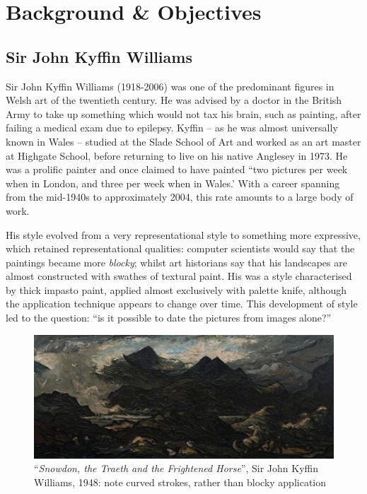 \chapter{Background \& Objectives}


\section{Sir John Kyffin Williams}

Sir John Kyffin Williams (1918-2006) was one of the predominant figures in Welsh art of the
twentieth century.  He was advised by a doctor in the British Army to take up something which
would not tax his brain, such as painting, after failing a medical exam due to epilepsy. Kyffin --
as he was almost universally known in Wales -- studied at the Slade School of Art and worked as an
art master at Highgate School, before returning to live on his native Anglesey in 1973.  He was a
prolific painter and once claimed to have painted ``two pictures per week when in London, and 
three per week when in Wales.'\cite[p.209]{Williams1993Across} With a career spanning from the 
mid-1940s to approximately 2004, this rate amounts to a large body of work.

His style evolved from a very representational style to something more
expressive, which retained representational qualities: computer scientists
would say that the paintings became more \emph{blocky}; whilst art
historians say that his landscapes are almost constructed with swathes of textural
paint. His was a style characterised by thick impasto paint, applied almost
exclusively with palette knife, although the application technique appears to
change over time. This development of style led to the question: ``is it possible to
date the pictures from images alone?''

\begin{figure}[h]
\includegraphics[width=\linewidth]{img/snowdon_horse.jpeg}
\caption[``\emph{Snowdon, the Traeth and the Frightened Horse}'']{``\emph{Snowdon, the Traeth and the Frightened Horse}'', Sir John Kyffin Williams, 1948: note curved strokes, rather than blocky application}\label{early_example}
\end{figure}


